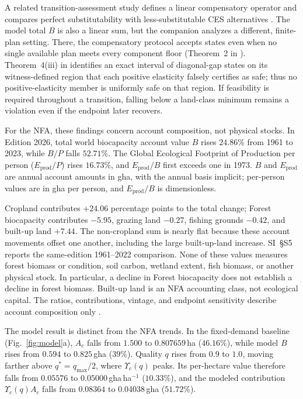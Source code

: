 \documentclass[preprint,12pt,authoryear]{elsarticle}
\newcommand{\Ups}{\Upsilon_c}
\begin{document}
A related transition-assessment study defines a linear compensatory operator and compares perfect substitutability with less-substitutable CES alternatives \citep[Sections~2 and 4 of][]{Abaee2026b}. The model total $B$ is also a linear sum, but the companion analyzes a different, finite-plan setting. There, the compensatory protocol accepts states even when no single available plan meets every component floor (Theorem~2 in \citet{Abaee2026b}). Theorem~4(iii) in \citet{Abaee2026b} identifies an exact interval of diagonal-gap states on its witness-defined region that each positive elasticity falsely certifies as safe; thus no positive-elasticity member is uniformly safe on that region. If feasibility is required throughout a transition, falling below a land-class minimum remains a violation even if the endpoint later recovers.

For the NFA, these findings concern account composition, not physical stocks. In Edition 2026, total world biocapacity account value $B$ rises $24.86\%$ from 1961 to 2023, while $B/P$ falls $52.71\%$. The Global Ecological Footprint of Production per person ($E_{\mathrm{prod}}/P$) rises $16.73\%$, and $E_{\mathrm{prod}}/B$ first exceeds one in 1973. $B$ and $E_{\mathrm{prod}}$ are annual account amounts in gha, with the annual basis implicit; per-person values are in gha per person, and $E_{\mathrm{prod}}/B$ is dimensionless.

Cropland contributes $+24.06$ percentage points to the total change; Forest biocapacity contributes $-5.95$, grazing land $-0.27$, fishing grounds $-0.42$, and built-up land $+7.44$. The non-cropland sum is nearly flat because these account movements offset one another, including the large built-up-land increase. SI~\S S5 reports the same-edition 1961--2022 comparison. None of these values measures forest biomass or condition, soil carbon, wetland extent, fish biomass, or another physical stock. In particular, a decline in Forest biocapacity does not establish a decline in forest biomass. Built-up land is an NFA accounting class, not ecological capital. The ratios, contributions, vintage, and endpoint sensitivity describe account composition only \citep{Lo2026NFA,Borucke2013,Blomqvist2013,GiampietroSaltelli2014,Galli2016,vdBerghGrazi2015}.

The model result is distinct from the NFA trends. In the fixed-demand baseline (Fig.~\ref{fig:model}a), $A_c$ falls from $1.500$ to $0.807659$\,ha ($46.16\%$), while model $B$ rises from $0.594$ to $0.825$\,gha ($39\%$). Quality $q$ rises from $0.9$ to $1.0$, moving farther above $q^*=q_{\max}/2$, where $\Ups(q)$ peaks. Its per-hectare value therefore falls from $0.05576$ to $0.05000$\,gha\,ha$^{-1}$ ($10.33\%$), and the modeled contribution $\Ups(q)A_c$ falls from $0.08364$ to $0.04038$\,gha ($51.72\%$).
\end{document}
